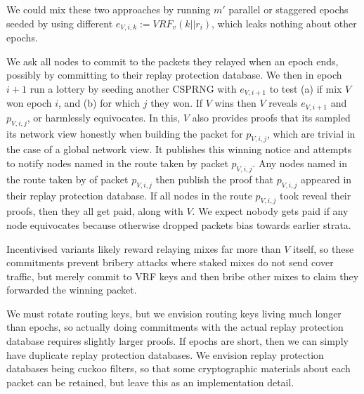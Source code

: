 ﻿\documentclass{sig-alternate-hotpets}
\newtheorem{question}{Question}
\begin{document}
We could mix these two approaches by running $m'$ parallel or staggered
epochs seeded by using different $e_{V,i,k} := VRF_v(k || r_i)$, which
leaks nothing about other epochs.  


We ask all nodes to commit to the packets they relayed when an epoch ends, possibly by committing to their replay protection database.  We then in epoch $i+1$ run a lottery by seeding another CSPRNG with $e_{V,i+1}$ to test (a) if mix $V$ won epoch $i$, and (b) for which $j$ they won.  If $V$ wins then $V$ reveals $e_{V,i+1}$ and $p_{V,i,j}$, or harmlessly equivocates.  In this, $V$ also provides proofs that its sampled its network view honestly when building the packet for $p_{V,i,j}$, which are trivial in the case of a global network view.  It publishes this winning notice and attempts to notify nodes named in the route taken by packet $p_{V,i,j}$.  Any nodes named in the route taken by of packet $p_{V,i,j}$ then publish the proof that $p_{V,i,j}$ appeared in their replay protection database.  If all nodes in the route $p_{V,i,j}$ took reveal their proofs, then they all get paid, along with $V$.  We expect nobody gets paid if any node equivocates because otherwise dropped packets bias towards earlier strata.

Incentivised variants likely reward relaying mixes far more than $V$ itself, so these commitments prevent bribery attacks where staked mixes do not send cover traffic, but merely commit to VRF keys and then bribe other mixes to claim they forwarded the winning packet.  


We must rotate routing keys, but we envision routing keys living much longer than epochs, so actually doing commitments with the actual replay protection database requires slightly larger proofs.  If epochs are short, then we can simply have duplicate replay protection databases.  We envision replay protection databases being cuckoo filters, so that some cryptographic materials about each packet can be retained, but leave this as an implementation detail.

\end{document}
